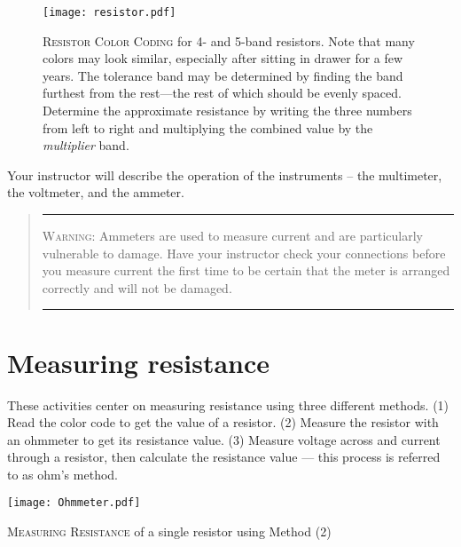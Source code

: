 \begin{figure}
	\centering
	\texttt{[image: resistor.pdf]}
	\caption[Resistor Color Chart]{\textsc{Resistor Color Coding} for 4- and 5-band resistors.  Note that many colors may look similar, especially after sitting in drawer for a few years.  The tolerance band may be determined by finding the band furthest from the rest---the rest of which should be evenly spaced.  Determine the approximate resistance by writing the three numbers from left to right and multiplying the combined value by the \textit{multiplier} band.}
\end{figure}

Your instructor will describe the operation of the instruments -- the multimeter, the voltmeter, and the ammeter. 
\begin{quote}\hrule
\textsc{Warning}:  Ammeters are used to measure current and are particularly vulnerable to damage.  Have your instructor check your connections before you measure current the first time to be certain that the meter is arranged correctly and will not be damaged. 
\hrule
\end{quote}


\section {Measuring resistance}
These activities center on measuring resistance using three different methods. (1) Read the color code to get the value of a resistor. (2) Measure the resistor with an ohmmeter to get  its resistance value. (3) Measure voltage across and current through a resistor, then calculate the resistance value --- this process is  referred to as ohm's method.

\begin{marginfigure}
	\texttt{[image: Ohmmeter.pdf]}
	\caption{\textsc{Measuring Resistance} of a single resistor using Method (2)}
	\label{f:mohm}
\end{marginfigure}


